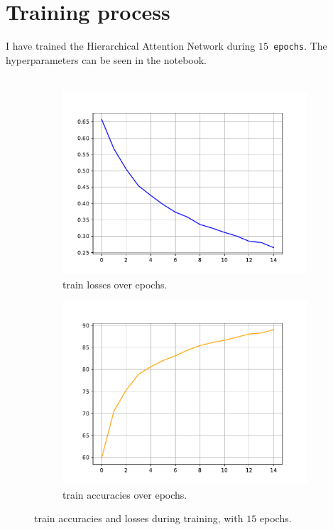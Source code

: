 \documentclass[a4paper]{article}
\begin{document}
\section{Training process}
\noindent
I have trained the Hierarchical Attention Network during \texttt{$15$ epochs}.
The hyperparameters can be seen in the notebook.
\\
\\
\noindent
\begin{figure}[H]
    \centering
    \begin{subfigure}[b]{0.45\textwidth}
        \centering
        \includegraphics[width=\textwidth]{../figures/train_loss.pdf}
        \caption{train losses over epochs.}
        \label{fig:image1}
    \end{subfigure}
    \hfill
    \begin{subfigure}[b]{0.45\textwidth}
        \centering
        \includegraphics[width=\textwidth]{../figures/train_accs.pdf}
        \caption{train accuracies over epochs.}
        \label{fig:image2}
    \end{subfigure}
    \caption{train accuracies and losses during training, with $15$ epochs.}
    \label{fig:images}
\end{figure}
\end{document}
